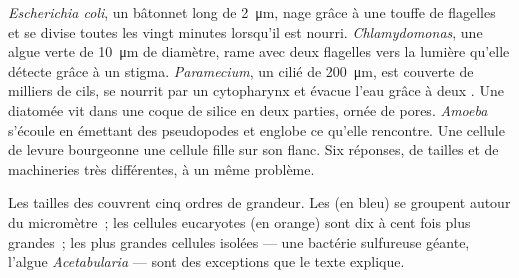 \begin{example}\label{ex:b2:unicellular-diversity:drop}
\emph{Escherichia coli}, un bâtonnet long de \qty{2}{\micro m}, nage
grâce à une touffe de flagelles et se divise toutes les vingt minutes
lorsqu'il est nourri. \emph{Chlamydomonas}, une algue verte de
\qty{10}{\micro m} de diamètre, rame avec deux flagelles vers la lumière
qu'elle détecte grâce à un stigma. \emph{Paramecium}, un cilié de
\qty{200}{\micro m}, est couverte de milliers de cils, se nourrit par un
cytopharynx et évacue l'eau grâce à deux . Une
diatomée vit dans une coque de silice en deux parties, ornée de pores.
\emph{Amoeba} s'écoule en émettant des pseudopodes et englobe ce
qu'elle rencontre. Une cellule de levure bourgeonne une cellule fille
sur son flanc. Six réponses, de tailles et de machineries très
différentes, à un même problème.
\end{example}

\begin{omfigure}

{\small Les tailles des  couvrent cinq ordres
de grandeur. Les  (en bleu) se groupent autour du micromètre~;
les cellules eucaryotes (en orange) sont dix à cent fois plus grandes~;
les plus grandes cellules isolées --- une bactérie sulfureuse géante,
l'algue \emph{Acetabularia} --- sont des exceptions que le texte explique.}
\end{omfigure}


